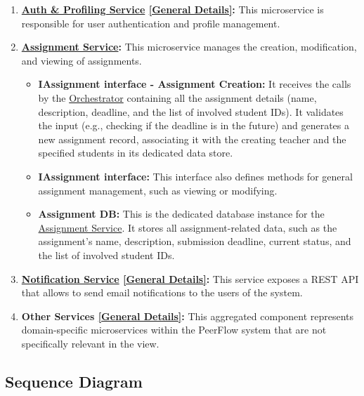 \begin{enumerate}
    \item \textbf{\hyperref[def:AuthProfilingService]{Auth \& Profiling Service} \hyperref[def:GenDetailsAuth]{[General Details]}:} This microservice is responsible for user authentication and profile management.
    
    \item \textbf{\hyperref[def:AssignmentService]{Assignment Service}:} This microservice manages the creation, modification, and viewing of assignments. 
    \begin{itemize}
        \item \textbf{IAssignment interface - Assignment Creation:}  It receives the calls by the \hyperref[def:Orchestrator]{Orchestrator} containing all the assignment details (name, description, deadline, and the list of involved student IDs). It validates the input (e.g., checking if the deadline is in the future) and generates a new assignment record, associating it with the creating teacher and the specified students in its dedicated data store.

        \item \textbf{IAssignment interface:} This interface also defines methods for general assignment management, such as viewing or modifying.

        \item \textbf{Assignment DB:} This is the dedicated database instance for the \hyperref[def:AssignmentService]{Assignment Service}. It stores all assignment-related data, such as the assignment's name, description, submission deadline, current status, and the list of involved student IDs.
    \end{itemize}
    
    \item \textbf{\hyperref[def:NotificationService]{Notification Service} \hyperref[def:GenDetailsNotification]{[General Details]}:} This service exposes a REST API that allows to send email notifications to the users of the system.
    
     \item \textbf{Other Services \hyperref[def:GenDetailsOtherServices]{[General Details]}:} This aggregated component represents domain-specific microservices within the PeerFlow system that are not specifically relevant in the view.
\end{enumerate}


\clearpage
\subsection{Sequence Diagram}

